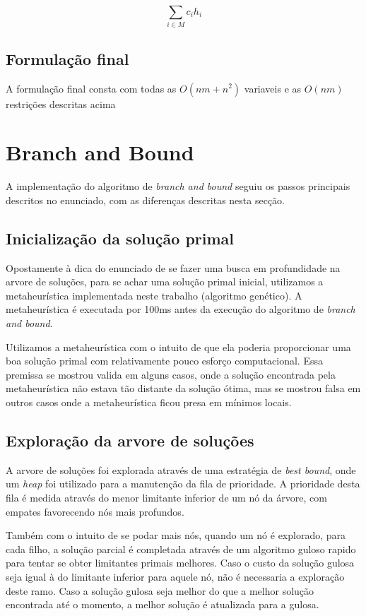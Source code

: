 \documentclass[a4paper,11pt]{article}
\begin{document}
\begin{equation}
  \sum_{i \in M} c_i h_i
\end{equation}

\subsection{Formulação final}
A formulação final consta com todas as $O(nm + n^2)$ variaveis e as $O(nm)$
restrições descritas acima

\section{Branch and Bound}
A implementação do algoritmo de \textit{branch and bound} seguiu os passos principais
descritos no enunciado, com as diferenças descritas nesta secção.

\subsection{Inicialização da solução primal}
Opostamente à dica do enunciado de se fazer uma busca em profundidade na arvore
de soluções, para se achar uma solução primal inicial, utilizamos a metaheurística
implementada neste trabalho (algoritmo genético). A metaheurística é executada
por 100ms antes da execução do algoritmo de \textit{branch and bound}.

Utilizamos a metaheurística com o intuito de que ela poderia proporcionar uma
boa solução primal com relativamente pouco esforço computacional. Essa premissa
se mostrou valida em alguns casos, onde a solução encontrada pela metaheurística
não estava tão distante da solução ótima, mas se mostrou falsa em outros casos
onde a metaheurística ficou presa em mínimos locais.

\subsection{Exploração da arvore de soluções}
A arvore de soluções foi explorada através de uma estratégia de \textit{best bound},
onde um \textit{heap} foi utilizado para a manutenção da fila de prioridade. A prioridade
desta fila é medida através do menor limitante inferior de um nó da árvore, com empates favorecendo
nós mais profundos.

Também com o intuito de se podar mais nós, quando um nó é explorado, para cada filho,
a solução parcial é completada através de um algoritmo guloso rapido para tentar se obter
limitantes primais melhores. Caso o custo da solução gulosa seja igual à do limitante
inferior para aquele nó, não é necessaria a exploração deste ramo. Caso a solução gulosa seja melhor
do que a melhor solução encontrada até o momento, a melhor solução é atualizada
para a gulosa.
\end{document}
